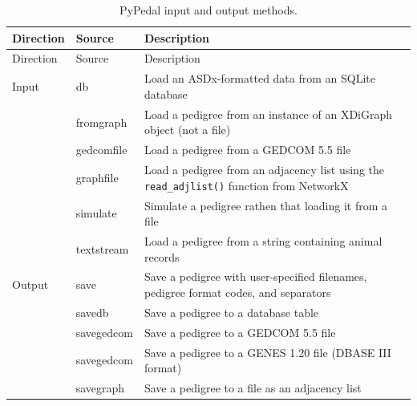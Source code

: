 \documentclass[
  letterpaper,
  DIV=11,
  numbers=noendperiod]{scrreprt}
\begin{document}
\begin{longtable}[]{@{}
  >{\raggedright\arraybackslash}p{}
  >{\raggedright\arraybackslash}p{}
  >{\raggedright\arraybackslash}p{}@{}}
\caption{PyPedal input and output
methods.}\label{tbl-input-output-methods}\tabularnewline
\toprule\noalign{}
\begin{minipage}[b]{\linewidth}\raggedright
Direction
\end{minipage} & \begin{minipage}[b]{\linewidth}\raggedright
Source
\end{minipage} & \begin{minipage}[b]{\linewidth}\raggedright
Description
\end{minipage} \\
\midrule\noalign{}
\endfirsthead
\toprule\noalign{}
\begin{minipage}[b]{\linewidth}\raggedright
Direction
\end{minipage} & \begin{minipage}[b]{\linewidth}\raggedright
Source
\end{minipage} & \begin{minipage}[b]{\linewidth}\raggedright
Description
\end{minipage} \\
\midrule\noalign{}
\endhead
\bottomrule\noalign{}
\endlastfoot
Input & db & Load an ASDx-formatted data from an SQLite database \\
& fromgraph & Load a pedigree from an instance of an XDiGraph object
(not a file) \\
& gedcomfile & Load a pedigree from a GEDCOM 5.5 file \\
& graphfile & Load a pedigree from an adjacency list using the
\texttt{read\_adjlist()} function from NetworkX \\
& simulate & Simulate a pedigree rathen that loading it from a file \\
& textstream & Load a pedigree from a string containing animal
records \\
Output & save & Save a pedigree with user-specified filenames, pedigree
format codes, and separators \\
& savedb & Save a pedigree to a database table \\
& savegedcom & Save a pedigree to a GEDCOM 5.5 file \\
& savegedcom & Save a pedigree to a GENES 1.20 file (DBASE III
format) \\
& savegraph & Save a pedigree to a file as an adjacency list \\
\end{longtable}
\end{document}
